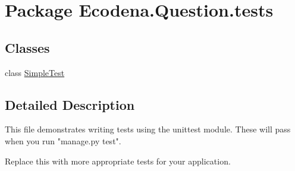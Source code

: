 \hypertarget{namespace_ecodena_1_1_question_1_1tests}{
\section{Package Ecodena.Question.tests}
\label{d8/def/namespace_ecodena_1_1_question_1_1tests}
}
\subsection*{Classes}
\begin{DoxyCompactItemize}
\item 
class \hyperlink{class_ecodena_1_1_question_1_1tests_1_1_simple_test}{SimpleTest}
\end{DoxyCompactItemize}


\subsection{Detailed Description}
\begin{DoxyVerb}
This file demonstrates writing tests using the unittest module. These will pass
when you run "manage.py test".

Replace this with more appropriate tests for your application.
\end{DoxyVerb}
 